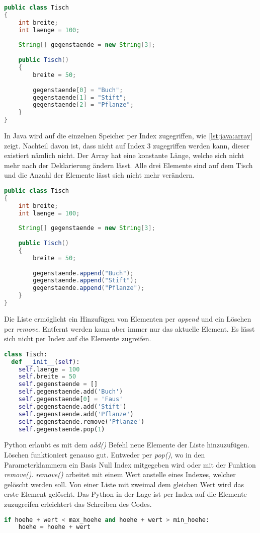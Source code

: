 \begin{lstlisting}[language=java,caption={Klasse in Python},captionpos=b,label={lst:java:array}]
public class Tisch
{
    int breite;
    int laenge = 100;
  
    String[] gegenstaende = new String[3];
  
    public Tisch()
    {
        breite = 50;
    
        gegenstaende[0] = "Buch";
        gegenstaende[1] = "Stift";
        gegenstaende[2] = "Pflanze";
    }
}
\end{lstlisting}

In Java wird auf die einzelnen Speicher per Index zugegriffen, wie \ref{lst:java:array} zeigt. Nachteil davon ist, dass nicht auf Index 3 zugegriffen werden kann, dieser existiert nämlich nicht. Der Array hat eine konstante Länge, welche sich nicht mehr nach der Deklarierung ändern lässt. Alle drei Elemente sind auf dem Tisch und die Anzahl der Elemente lässt sich nicht mehr verändern.

\begin{lstlisting}[language=java,caption={Klasse in Python},captionpos=b,label={lst:java:liste}]
public class Tisch
{
    int breite;
    int laenge = 100;
  
    String[] gegenstaende = new String[3];
  
    public Tisch()
    {
        breite = 50;
    
        gegenstaende.append("Buch");
        gegenstaende.append("Stift");
        gegenstaende.append("Pflanze");
    }
}
\end{lstlisting}

Die Liste ermöglicht ein Hinzufügen von Elementen per \textit{append} und ein Löschen per \textit{remove}. Entfernt werden kann aber immer nur das aktuelle Element. Es lässt sich nicht per Index auf die Elemente zugreifen.

\begin{lstlisting}[language=python,caption={Klasse in Python},captionpos=b,label={lst:python:liste}]
class Tisch:
  def __init__(self):
    self.laenge = 100
    self.breite = 50
    self.gegenstaende = []
    self.gegenstaende.add('Buch')
    self.gegenstaende[0] = 'Faus'
    self.gegenstaende.add('Stift')
    self.gegenstaende.add('Pflanze')
    self.gegenstaende.remove('Pflanze')
    self.gegenstaende.pop(1)
\end{lstlisting}

Python erlaubt es mit dem \textit{add()} Befehl neue Elemente der Liste hinzuzufügen. Löschen funktioniert genauso gut. Entweder per \textit{pop()}, wo in den Parameterklammern ein Basis Null Index mitgegeben wird oder mit der Funktion \textit{remove()}. \textit{remove()} arbeitet mit einem Wert anstelle eines Indexes, welcher gelöscht werden soll. Von einer Liste mit zweimal dem gleichen Wert wird das erste Element gelöscht. Das Python in der Lage ist per Index auf die Elemente zuzugreifen erleichtert das Schreiben des Codes.

\begin{lstlisting}[language=python,caption={If-Verzweigung in Python},captionpos=b,label={lst:python:if}]
if hoehe + wert < max_hoehe and hoehe + wert > min_hoehe:
    hoehe = hoehe + wert
\end{lstlisting}
